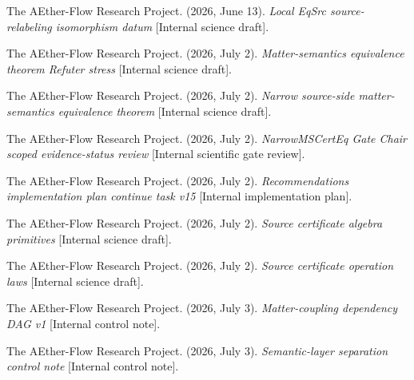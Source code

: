 \documentclass[11pt]{article}
\begin{document}
The AEther-Flow Research Project. (2026, June 13). \emph{Local EqSrc
source-relabeling isomorphism datum} [Internal science draft].

The AEther-Flow Research Project. (2026, July 2). \emph{Matter-semantics
equivalence theorem Refuter stress} [Internal science draft].

The AEther-Flow Research Project. (2026, July 2). \emph{Narrow source-side
matter-semantics equivalence theorem} [Internal science draft].

The AEther-Flow Research Project. (2026, July 2). \emph{NarrowMSCertEq Gate
Chair scoped evidence-status review} [Internal scientific gate review].

The AEther-Flow Research Project. (2026, July 2). \emph{Recommendations
implementation plan continue task v15} [Internal implementation plan].

The AEther-Flow Research Project. (2026, July 2). \emph{Source certificate
algebra primitives} [Internal science draft].

The AEther-Flow Research Project. (2026, July 2). \emph{Source certificate
operation laws} [Internal science draft].

The AEther-Flow Research Project. (2026, July 3). \emph{Matter-coupling
dependency DAG v1} [Internal control note].

The AEther-Flow Research Project. (2026, July 3). \emph{Semantic-layer
separation control note} [Internal control note].
\end{document}
